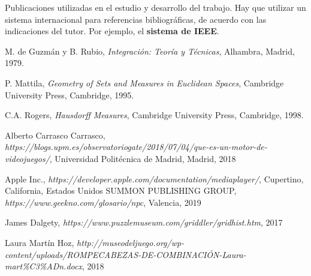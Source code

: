 \begin{thebibliography}{99}
 Publicaciones utilizadas en el estudio y desarrollo del trabajo.
Hay que utilizar un sistema internacional para referencias bibliográficas, de acuerdo con las indicaciones del tutor. Por ejemplo, el \textbf{sistema de IEEE}.

 M. de Guzmán y B. Rubio, \textit{Integración: Teoría y Técnicas}, Alhambra, Madrid, 1979.

 P. Mattila, \textit{Geometry of Sets and Measures in Euclidean Spaces}, Cambridge University Press, Cambridge, 1995.

 C.A. Rogers, \textit{Hausdorff Measures}, Cambridge University Press, Cambridge, 1998.

 Alberto Carrasco Carrasco, \textit{https://blogs.upm.es/observatoriogate/2018/07/04/que-es-un-motor-de-videojuegos/}, Universidad Politécnica de Madrid, Madrid, 2018

 Apple Inc., \textit{https://developer.apple.com/documentation/mediaplayer/}, Cupertino, California, Estados Unidos
 SUMMON PUBLISHING GROUP, \textit{https://www.geekno.com/glosario/npc}, Valencia, 2019

 James Dalgety, \textit{https://www.puzzlemuseum.com/griddler/gridhist.htm}, 2017

 Laura Martín Hoz, \textit{http://museodeljuego.org/wp-content/uploads/ROMPECABEZAS-DE-COMBINACIÓN-Laura-mart\%C3\%ADn.docx}, 2018



\end{thebibliography}
